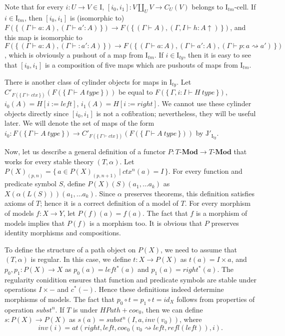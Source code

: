 \documentclass[reqno]{amsart}
\theoremstyle{definition}
\theoremstyle{remark}
\newcommand{\repl}{:=}
\newcommand{\idtype}{\rightsquigarrow}
\newcommand{\cat}[1]{\mathbf{#1}}
\newcommand{\Mod}[1]{#1\text{-}\cat{Mod}}
\newcommand{\I}{\mathrm{I}}
\newcommand{\J}{\mathrm{J}}
\newcommand{\class}[2]{#1\text{-}\mathrm{#2}}
\newcommand{\Icell}[1][\I]{\class{#1}{cell}}
\newcommand{\cyli}{i}
\numberwithin{figure}{section}
\begin{document}
Note that for every $i : U \to V \in \I$, $[\cyli_0,\cyli_1] : V \amalg_U V \to C_U(V)$ belongs to $\Icell[\I_{tm}]$.
If $i \in \I_{tm}$, then $[\cyli_0,\cyli_1]$ is (isomorphic to) $F(\{\,(\Gamma \vdash a : A), (\Gamma \vdash a' : A)\,\}) \to F(\{\,(\Gamma \vdash A), (\Gamma, I \vdash h : A\!\uparrow)\,\})$,
and this map is isomorphic to $F(\{\,(\Gamma \vdash a : A), (\Gamma \vdash : a' : A)\,\}) \to F(\{\,(\Gamma \vdash a : A), (\Gamma \vdash a' : A), (\Gamma \vdash p : a \idtype a')\,\})$,
which is obviously a pushout of a map from $\I_{tm}$.
If $i \in \I_{ty}$, then it is easy to see that $[\cyli_0,\cyli_1]$ is a composition of five maps which are pushouts of maps from $\I_{tm}$.

There is another class of cylinder objects for maps in $\I_{ty}$.
Let $C'_{F(\{\,\Gamma \vdash ctx\,\})}(F(\{\,\Gamma \vdash A\ type\,\}))$ be equal to $F(\{\,\Gamma, i : I \vdash H\ type\,\})$, $\cyli_0(A) = H[i \repl left]$, $\cyli_1(A) = H[i \repl right]$.
We cannot use these cylinder objects directly since $[\cyli_0,\cyli_1]$ is not a cofibration; nevertheless, they will be useful later.
We will denote the set of maps of the form $\cyli_0 : F(\{\,\Gamma \vdash A\ type\,\}) \to C'_{F(\{\,\Gamma \vdash ctx\,\})}(F(\{\,\Gamma \vdash A\ type\,\}))$ by $\J'_{\I_{ty}}$.

Now, let us describe a general definition of a functor $P : \Mod{T} \to \Mod{T}$ that works for every stable theory $(T,\alpha)$.
Let $P(X)_{(p,n)} = \{\,a \in P(X)_{(p,n+1)}\ |\ ctx^n(a) = I\,\}$.
For every function and predicate symbol $S$, define $P(X)(S)(a_1, \ldots a_k)$ as $X(\alpha(L(S)))(a_1, \ldots a_k)$.
Since $\alpha$ preserves theorems, this definition satisfies axioms of $T$; hence it is a correct definition of a model of $T$.
For every morphism of models $f : X \to Y$, let $P(f)(a) = f(a)$.
The fact that $f$ is a morphism of models implies that $P(f)$ is a morphism too.
It is obvious that $P$ preserves identity morphisms and compositions.

To define the structure of a path object on $P(X)$, we need to assume that $(T,\alpha)$ is regular.
In this case, we define $t : X \to P(X)$ as $t(a) = I \times a$, and $p_0,p_1 : P(X) \to X$ as $p_0(a) = left^*(a)$ and $p_1(a) = right^*(a)$.
The regularity conidition ensures that function and predicate symbols are stable under operations $I \times -$ and $c^*(-)$.
Hence these definitions indeed determine morphisms of models.
The fact that $p_0 \circ t = p_1 \circ t = id_X$ follows from properties of operation $subst^n$.
If $T$ is under $HPath + coe_0$, then we can define $s : P(X) \to P(X)$ as $s(a) = subst^n(I, a, inv(v_0))$, where
\[ inv(i) = at(right, left, coe_0(v_0 \idtype left, refl(left)), i). \]
\end{document}
